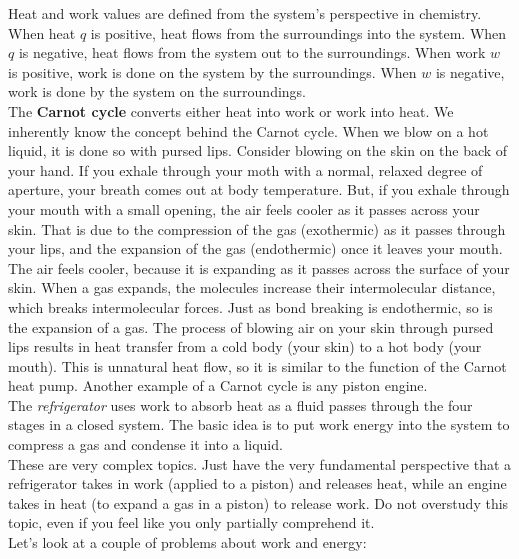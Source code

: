 \documentclass{article}
\theoremstyle{plain}%
\theoremstyle{definition}
\theoremstyle{remark}
\begin{document}
\indent Heat and work values are defined from the system's perspective in chemistry. When heat $q$ is positive, heat flows from the surroundings into the system. When $q$ is negative, heat flows from the system out to the surroundings. When work $w$ is positive, work is done on the system by the surroundings. When $w$ is negative, work is done by the system on the surroundings. \\
\indent The \textbf{Carnot cycle} converts either heat into work or work into heat. We inherently know the concept behind the Carnot cycle. When we blow on a hot liquid, it is done so with pursed lips. Consider blowing on the skin on the back of your hand. If you exhale through your moth with a normal, relaxed degree of aperture, your breath comes out at body temperature. But, if you exhale through your mouth with a small opening, the air feels cooler as it passes across your skin. That is due to the compression of the gas (exothermic) as it passes through your lips, and the expansion of the gas (endothermic) once it leaves your mouth. The air feels cooler, because it is expanding as it passes across the surface of your skin. When a gas expands, the molecules increase their intermolecular distance, which breaks intermolecular forces. Just as bond breaking is endothermic, so is the expansion of a gas. The process of blowing air on your skin through pursed lips results in heat transfer from a cold body (your skin) to a hot body (your mouth). This is unnatural heat flow, so it is similar to the function of the Carnot heat pump. Another example of a Carnot cycle is any piston engine.\\
\indent The \textit{refrigerator} uses work to absorb heat as a fluid passes through the four stages in a closed system. The basic idea is to put work energy into the system to compress a gas and condense it into a liquid. \\
\indent These are very complex topics. Just have the very fundamental perspective that a refrigerator takes in work (applied to a piston) and releases heat, while an engine takes in heat (to expand a gas in a piston) to release work. Do not overstudy this topic, even if you feel like you only partially comprehend it. \\
\indent Let's look at a couple of problems about work and energy:
\end{document}

